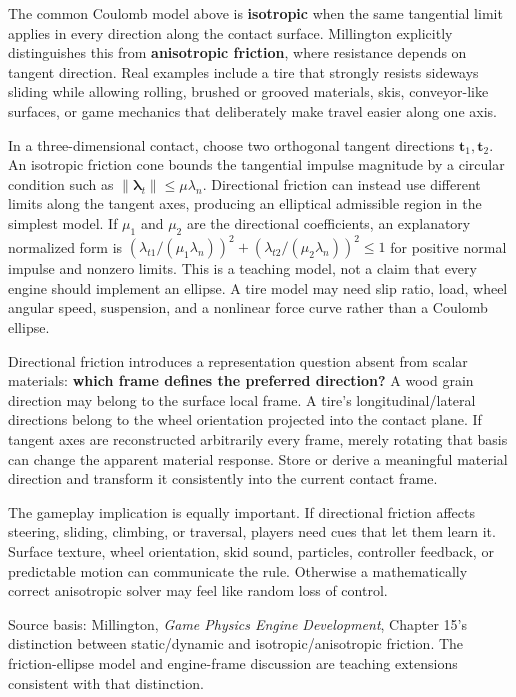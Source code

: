 \hypertarget{06-engine-ii-ch047-friction-can-be-directional-so-one-scalar-coefficient-is-not-always-enough}{}

The common Coulomb model above is \textbf{isotropic} when the same tangential limit applies in every direction along the contact surface. Millington explicitly distinguishes this from \textbf{anisotropic friction}, where resistance depends on tangent direction. Real examples include a tire that strongly resists sideways sliding while allowing rolling, brushed or grooved materials, skis, conveyor-like surfaces, or game mechanics that deliberately make travel easier along one axis.

In a three-dimensional contact, choose two orthogonal tangent directions \(\mathbf{t}_1,\mathbf{t}_2\). An isotropic friction cone bounds the tangential impulse magnitude by a circular condition such as \(\|\boldsymbol{\lambda}_t\|\le\mu\lambda_n\). Directional friction can instead use different limits along the tangent axes, producing an elliptical admissible region in the simplest model. If \(\mu_1\) and \(\mu_2\) are the directional coefficients, an explanatory normalized form is \((\lambda_{t1}/(\mu_1\lambda_n))^2+(\lambda_{t2}/(\mu_2\lambda_n))^2\le1\) for positive normal impulse and nonzero limits. This is a teaching model, not a claim that every engine should implement an ellipse. A tire model may need slip ratio, load, wheel angular speed, suspension, and a nonlinear force curve rather than a Coulomb ellipse.

Directional friction introduces a representation question absent from scalar materials: \textbf{which frame defines the preferred direction?} A wood grain direction may belong to the surface local frame. A tire's longitudinal/lateral directions belong to the wheel orientation projected into the contact plane. If tangent axes are reconstructed arbitrarily every frame, merely rotating that basis can change the apparent material response. Store or derive a meaningful material direction and transform it consistently into the current contact frame.

The gameplay implication is equally important. If directional friction affects steering, sliding, climbing, or traversal, players need cues that let them learn it. Surface texture, wheel orientation, skid sound, particles, controller feedback, or predictable motion can communicate the rule. Otherwise a mathematically correct anisotropic solver may feel like random loss of control.

Source basis: Millington, \emph{Game Physics Engine Development}, Chapter 15's distinction between static/dynamic and isotropic/anisotropic friction. The friction-ellipse model and engine-frame discussion are teaching extensions consistent with that distinction.

